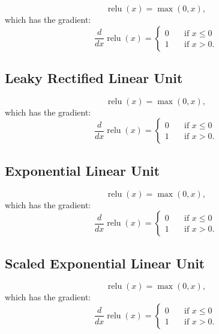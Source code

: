 \documentclass{article}
\DeclareMathOperator{\relu}{relu}
\begin{document}
\begin{equation}
  \relu(x) = \max(0, x) ,
\end{equation} 
which has the gradient:
\begin{equation}
  \frac{d}{dx} \relu(x) =
     \begin{cases} 
      0      & \quad \text{if } x \leq  0 \\
      1       & \quad \text{if } x > 0 .
    \end{cases} 
\end{equation}

\subsection{Leaky Rectified Linear Unit}

\begin{equation}
  \relu(x) = \max(0, x) ,
\end{equation} 
which has the gradient:
\begin{equation}
  \frac{d}{dx} \relu(x) =
     \begin{cases} 
      0      & \quad \text{if } x \leq  0 \\
      1       & \quad \text{if } x > 0 .
    \end{cases} 
\end{equation}

\subsection{Exponential Linear Unit}

\begin{equation}
  \relu(x) = \max(0, x) ,
\end{equation} 
which has the gradient:
\begin{equation}
  \frac{d}{dx} \relu(x) =
     \begin{cases} 
      0      & \quad \text{if } x \leq  0 \\
      1       & \quad \text{if } x > 0 .
    \end{cases} 
\end{equation}

\subsection{Scaled Exponential Linear Unit}

\begin{equation}
  \relu(x) = \max(0, x) ,
\end{equation} 
which has the gradient:
\begin{equation}
  \frac{d}{dx} \relu(x) =
     \begin{cases} 
      0      & \quad \text{if } x \leq  0 \\
      1       & \quad \text{if } x > 0 .
    \end{cases} 
\end{equation}
\end{document}
